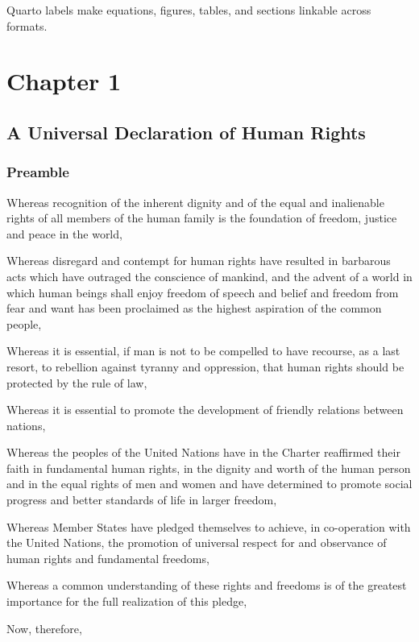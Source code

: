 \documentclass[
  ngerman,
  american,
  titlepage,
  openright,
  DIV=calc,
  toc=listof,
  listof=nochaptergap]{scrbook}
\begin{document}
Quarto labels make equations, figures, tables, and sections linkable
across formats.

\chapter{Chapter 1}\label{sec-chapter1}

\section{A Universal Declaration of Human
Rights}\label{a-universal-declaration-of-human-rights}

\subsection{Preamble}\label{preamble}

Whereas recognition of the inherent dignity and of the equal and
inalienable rights of all members of the human family is the foundation
of freedom, justice and peace in the world,

Whereas disregard and contempt for human rights have resulted in
barbarous acts which have outraged the conscience of mankind, and the
advent of a world in which human beings shall enjoy freedom of speech
and belief and freedom from fear and want has been proclaimed as the
highest aspiration of the common people,

Whereas it is essential, if man is not to be compelled to have recourse,
as a last resort, to rebellion against tyranny and oppression, that
human rights should be protected by the rule of law,

Whereas it is essential to promote the development of friendly relations
between nations,

Whereas the peoples of the United Nations have in the Charter reaffirmed
their faith in fundamental human rights, in the dignity and worth of the
human person and in the equal rights of men and women and have
determined to promote social progress and better standards of life in
larger freedom,

Whereas Member States have pledged themselves to achieve, in
co-operation with the United Nations, the promotion of universal respect
for and observance of human rights and fundamental freedoms,

Whereas a common understanding of these rights and freedoms is of the
greatest importance for the full realization of this pledge,

Now, therefore,
\end{document}

